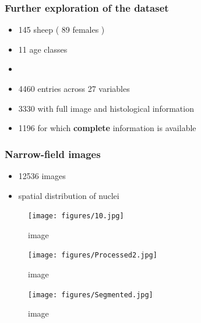 \documentclass{article}
\begin{document}
    \subsubsection{Further exploration of the dataset}


    \begin{itemize}
\item
  145 sheep ( 89 females )
\item
  11 age classes
\item
\end{itemize}

    \begin{itemize}
\itemsep1pt\parskip0pt
\item
  4460 entries across 27 variables
\item
  3330 with full image and histological information
\item
  1196 for which \textbf{complete} information is available
\end{itemize}


    \subsubsection{Narrow-field images}


    \begin{itemize}
\itemsep1pt\parskip0pt
\item
  12536 images
\item
  spatial distribution of nuclei
\end{itemize}

    \begin{figure}[htbp]
\centering
\texttt{[image: figures/10.jpg]}
\caption{image}
\end{figure}

    \begin{figure}[htbp]
\centering
\texttt{[image: figures/Processed2.jpg]}
\caption{image}
\end{figure}

    \begin{figure}[htbp]
\centering
\texttt{[image: figures/Segmented.jpg]}
\caption{image}
\end{figure}

    


    
    
    
    
\end{document}
